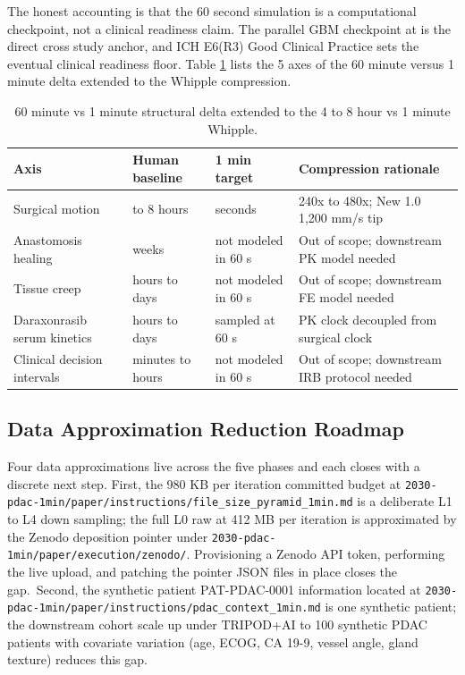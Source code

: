 The honest accounting is that the 60 second simulation is a
computational checkpoint, not a clinical readiness claim. The
parallel GBM checkpoint at \cite{kawchak_2026_20113157} is the
direct cross study anchor, and ICH E6(R3) Good Clinical Practice
\cite{ich-e6r3} sets the eventual clinical readiness floor.
Table \ref{tab:limits-time} lists the 5 axes of the 60 minute
versus 1 minute delta extended to the Whipple compression.

\clearpage

\begin{table}[H]
\caption{60 minute vs 1 minute structural delta extended to the 4 to 8 hour vs 1 minute Whipple.}
\label{tab:limits-time}
\centering
\begin{tabular}{>{\raggedright\arraybackslash}p{3.3cm} >{\raggedright\arraybackslash}p{3.4cm} >{\raggedright\arraybackslash}p{3.7cm} >{\raggedright\arraybackslash}p{4.4cm}}
\toprule
\textbf{Axis} & \textbf{Human baseline} & \textbf{1 min target} & \textbf{Compression rationale} \\
\midrule
  Surgical motion & 4 to 8 hours & 60 seconds & 240x to 480x; New 1.0 1,200 mm/s tip \\
  Anastomosis healing & weeks & not modeled in 60 s & Out of scope; downstream PK model needed \\
  Tissue creep & hours to days & not modeled in 60 s & Out of scope; downstream FE model needed \\
  Daraxonrasib serum kinetics & hours to days & sampled at 60 s & PK clock decoupled from surgical clock \\
  Clinical decision intervals & minutes to hours & not modeled in 60 s & Out of scope; downstream IRB protocol needed \\
\bottomrule
\end{tabular}
\end{table}

\subsection{Data Approximation Reduction Roadmap}
\label{sec:limits-data}

Four data approximations live across the five phases and each
closes with a discrete next step. First, the 980 KB per iteration
committed budget at
\texttt{2030-pdac-1min/paper/instructions/file_size_pyramid_1min.md}
is a deliberate L1 to L4 down sampling; the full L0 raw at 412 MB
per iteration is approximated by the Zenodo deposition pointer
under \texttt{2030-pdac-1min/paper/execution/zenodo/}. Provisioning
a Zenodo API token, performing the live upload, and patching the
pointer JSON files in place closes the gap.\ Second, the synthetic
patient PAT-PDAC-0001 information located at
\texttt{2030-pdac-1min/paper/instructions/pdac_context_1min.md} is
one synthetic patient; the downstream cohort scale up under
TRIPOD+AI \cite{Collins2024TRIPODAI} to 100 synthetic PDAC patients
with covariate variation (age, ECOG, CA 19-9, vessel angle, gland
texture) reduces this gap.

